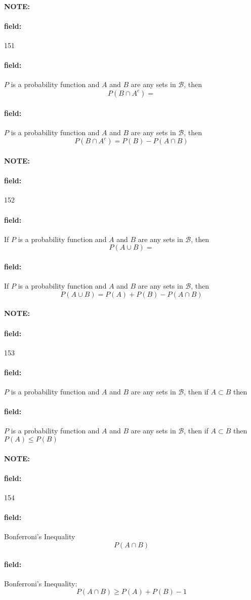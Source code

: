 \documentclass[12pt]{article}
\newenvironment{note}{\paragraph{NOTE:}}{}
\newenvironment{field}{\paragraph{field:}}{}
\begin{document}
\begin{note} \begin{field} \tiny 151 \end{field}
    \begin{field}
         $P$ is a probability function and $A$ and $B$ are any sets in $\mathcal{B}$, then $$P(B\cap A^c) = $$
    \end{field}
    \begin{field}
         $P$ is a probability function and $A$ and $B$ are any sets in $\mathcal{B}$, then $$P(B\cap A^c) = P(B) - P(A \cap B)$$
    \end{field}
\end{note}

\begin{note} \begin{field} \tiny 152 \end{field}
    \begin{field}
        If $P$ is a probability function and $A$ and $B$ are any sets in $\mathcal{B}$, then $$P(A\cup B) = $$
    \end{field}
    \begin{field}
        If $P$ is a probability function and $A$ and $B$ are any sets in $\mathcal{B}$, then $$P(A\cup B) = P(A) + P(B) - P(A \cap B)$$
    \end{field}
\end{note}

\begin{note} \begin{field} \tiny 153 \end{field}
    \begin{field}
         $P$ is a probability function and $A$ and $B$ are any sets in $\mathcal{B}$, then if $A \subset B$ then
    \end{field}
    \begin{field}
         $P$ is a probability function and $A$ and $B$ are any sets in $\mathcal{B}$, then if $A \subset B$ then $P(A) \leq P(B)$
    \end{field}
\end{note}

\begin{note} \begin{field} \tiny 154 \end{field}
    \begin{field}
        Bonferroni's Inequality
        $$P(A\cap B)  $$
    \end{field}
    \begin{field}
      Bonferroni's Inequality:
        $$P(A\cap B) \geq P(A) + P(B) -1 $$
    \end{field}
\end{note}
\end{document}
